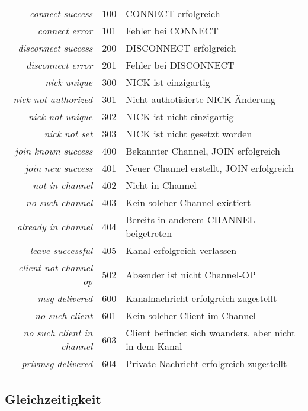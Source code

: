 \documentclass{article}
\begin{document}
\begin{tabular}{rrl}

  \emph{connect success}           & 100 & CONNECT erfolgreich \\
  \emph{connect error}             & 101 & Fehler bei CONNECT \\
  \emph{disconnect success}        & 200 & DISCONNECT erfolgreich \\
  \emph{disconnect error}          & 201 & Fehler bei DISCONNECT \\
  \emph{nick unique}               & 300 & NICK ist einzigartig \\
  \emph{nick not authorized}       & 301 & Nicht authotisierte NICK-Änderung \\
  \emph{nick not unique}           & 302 & NICK ist nicht einzigartig \\
  \emph{nick not set}              & 303 & NICK ist nicht gesetzt worden \\
  \emph{join known success}        & 400 & Bekannter Channel, JOIN erfolgreich \\
  \emph{join new success}          & 401 & Neuer Channel erstellt, JOIN erfolgreich \\
  \emph{not in channel}            & 402 & Nicht in Channel \\
  \emph{no such channel}           & 403 & Kein solcher Channel existiert \\
  \emph{already in channel}        & 404 & Bereits in anderem CHANNEL beigetreten \\
  \emph{leave successful}          & 405 & Kanal erfolgreich verlassen \\
  \emph{client not channel op}     & 502 & Absender ist nicht Channel-OP \\
  \emph{msg delivered}             & 600 & Kanalnachricht erfolgreich zugestellt \\
  \emph{no such client}            & 601 & Kein solcher Client im Channel \\
  \emph{no such client in channel} & 603 & Client befindet sich woanders, aber nicht in dem Kanal \\
  \emph{privmsg delivered}         & 604 & Private Nachricht erfolgreich zugestellt \\
\end{tabular}

\subsection{Gleichzeitigkeit}
\end{document}
